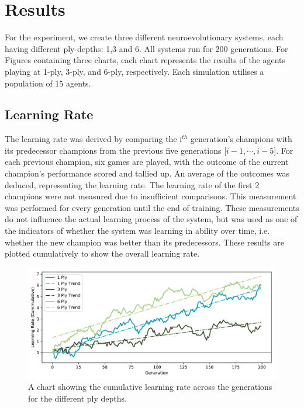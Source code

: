 \documentclass[12pt,a4paper]{article}
\begin{document}
\section{Results}
    

    For the experiment, we create three different neuroevolutionary systems, each having different ply-depths: 1,3 and 6. All systems run for 200 generations. For Figures containing three charts, each chart represents the results of the agents playing at 1-ply, 3-ply, and 6-ply, respectively. Each simulation utilises a population of 15 agents.

    \subsection{Learning Rate}
    
    The learning rate was derived by comparing the i$^{th}$ generation's champions with its predecessor champions from the previous five generations [$i-1, \cdots, i-5$]. For each previous champion, six games are played, with the outcome of the current champion's performance scored and tallied up. An average of the outcomes was deduced, representing the learning rate. The learning rate of the first 2 champions were not measured due to insufficient comparisons. This measurement was performed for every generation until the end of training. These measurements do not influence the actual learning process of the system, but was used as one of the indicators of whether the system was learning in ability over time, i.e. whether the new champion was better than its predecessors. These results are plotted cumulatively to show the overall learning rate.
    
    \begin{figure}[!ht]
        \centering
        \includegraphics[width=160mm]{images/results/combined_cummulative.pdf}
        \caption{A chart showing the cumulative learning rate across the generations for the different ply depths.\label{cum_growth}}
    \end{figure}
    
\end{document}

